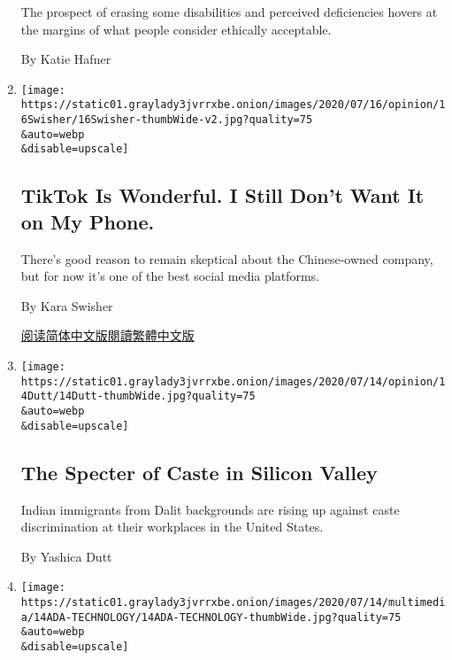 \begin{enumerate}
  The prospect of erasing some disabilities and perceived deficiencies
  hovers at the margins of what people consider ethically acceptable.

  By Katie Hafner
\item
  \href{/2020/07/17/opinion/tiktok-ban-china.html}{}

  \texttt{[image: https://static01.graylady3jvrrxbe.onion/images/2020/07/16/opinion/16Swisher/16Swisher-thumbWide-v2.jpg?quality=75\\\&auto=webp\\\&disable=upscale]}

  \hypertarget{tiktok-is-wonderful-i-still-dont-want-it-on-my-phone}{%
  \subsection{TikTok Is Wonderful. I Still Don't Want It on My
  Phone.}\label{tiktok-is-wonderful-i-still-dont-want-it-on-my-phone}}

  There's good reason to remain skeptical about the Chinese-owned
  company, but for now it's one of the best social media platforms.

  By Kara Swisher

  \href{https://cn.nytimes3xbfgragh.onion/opinion/20200720/tiktok-ban-china/}{阅读简体中文版}\href{https://cn.nytimes3xbfgragh.onion/opinion/20200720/tiktok-ban-china/zh-hant/}{閱讀繁體中文版}
\item
  \href{/2020/07/14/opinion/caste-cisco-indian-americans-discrimination.html}{}

  \texttt{[image: https://static01.graylady3jvrrxbe.onion/images/2020/07/14/opinion/14Dutt/14Dutt-thumbWide.jpg?quality=75\\\&auto=webp\\\&disable=upscale]}

  \hypertarget{the-specter-of-caste-in-silicon-valley}{%
  \subsection{The Specter of Caste in Silicon
  Valley}\label{the-specter-of-caste-in-silicon-valley}}

  Indian immigrants from Dalit backgrounds are rising up against caste
  discrimination at their workplaces in the United States.

  By Yashica Dutt
\item
  \href{/2020/07/14/style/assistive-technology.html}{}

  \texttt{[image: https://static01.graylady3jvrrxbe.onion/images/2020/07/14/multimedia/14ADA-TECHNOLOGY/14ADA-TECHNOLOGY-thumbWide.jpg?quality=75\\\&auto=webp\\\&disable=upscale]}


\end{enumerate}

